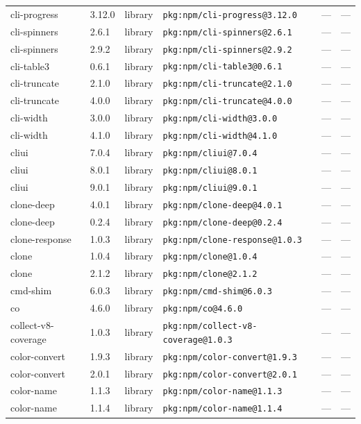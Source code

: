 \documentclass[11pt]{article}
\begin{document}
\begin{longtable}{|l|l|l|p{2.2cm}|l|p{4cm}|}
cli-progress & 3.12.0 & library & \texttt{pkg:npm/cli-progress@3.12.0} & — & — \\
cli-spinners & 2.6.1 & library & \texttt{pkg:npm/cli-spinners@2.6.1} & — & — \\
cli-spinners & 2.9.2 & library & \texttt{pkg:npm/cli-spinners@2.9.2} & — & — \\
cli-table3 & 0.6.1 & library & \texttt{pkg:npm/cli-table3@0.6.1} & — & — \\
cli-truncate & 2.1.0 & library & \texttt{pkg:npm/cli-truncate@2.1.0} & — & — \\
cli-truncate & 4.0.0 & library & \texttt{pkg:npm/cli-truncate@4.0.0} & — & — \\
cli-width & 3.0.0 & library & \texttt{pkg:npm/cli-width@3.0.0} & — & — \\
cli-width & 4.1.0 & library & \texttt{pkg:npm/cli-width@4.1.0} & — & — \\
cliui & 7.0.4 & library & \texttt{pkg:npm/cliui@7.0.4} & — & — \\
cliui & 8.0.1 & library & \texttt{pkg:npm/cliui@8.0.1} & — & — \\
cliui & 9.0.1 & library & \texttt{pkg:npm/cliui@9.0.1} & — & — \\
clone-deep & 4.0.1 & library & \texttt{pkg:npm/clone-deep@4.0.1} & — & — \\
clone-deep & 0.2.4 & library & \texttt{pkg:npm/clone-deep@0.2.4} & — & — \\
clone-response & 1.0.3 & library & \texttt{pkg:npm/clone-response@1.0.3} & — & — \\
clone & 1.0.4 & library & \texttt{pkg:npm/clone@1.0.4} & — & — \\
clone & 2.1.2 & library & \texttt{pkg:npm/clone@2.1.2} & — & — \\
cmd-shim & 6.0.3 & library & \texttt{pkg:npm/cmd-shim@6.0.3} & — & — \\
co & 4.6.0 & library & \texttt{pkg:npm/co@4.6.0} & — & — \\
collect-v8-coverage & 1.0.3 & library & \texttt{pkg:npm/collect-v8-coverage@1.0.3} & — & — \\
color-convert & 1.9.3 & library & \texttt{pkg:npm/color-convert@1.9.3} & — & — \\
color-convert & 2.0.1 & library & \texttt{pkg:npm/color-convert@2.0.1} & — & — \\
color-name & 1.1.3 & library & \texttt{pkg:npm/color-name@1.1.3} & — & — \\
color-name & 1.1.4 & library & \texttt{pkg:npm/color-name@1.1.4} & — & — \\

\end{longtable}
\end{document}
